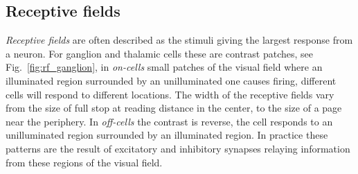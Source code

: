\documentclass[11pt,a4paper]{scrartcl}
\begin{document}
\subsection*{Receptive fields}
\textsl{Receptive fields} are often described as the stimuli giving
the largest response from a neuron. For ganglion and thalamic cells
these are contrast patches, see Fig.~\ref{fig:rf_ganglion}, in
\textsl{on-cells} small patches of the visual field where an
illuminated region surrounded by an unilluminated one causes firing,
different cells will respond to different locations. The width of the
receptive fields vary from the size of full stop at reading distance
in the center, to the size of a page near the periphery. In
\textsl{off-cells} the contrast is reverse, the cell responds to an
unilluminated region surrounded by an illuminated region. In practice
these patterns are the result of excitatory and inhibitory synapses
relaying information from these regions of the visual field.
\end{document}
